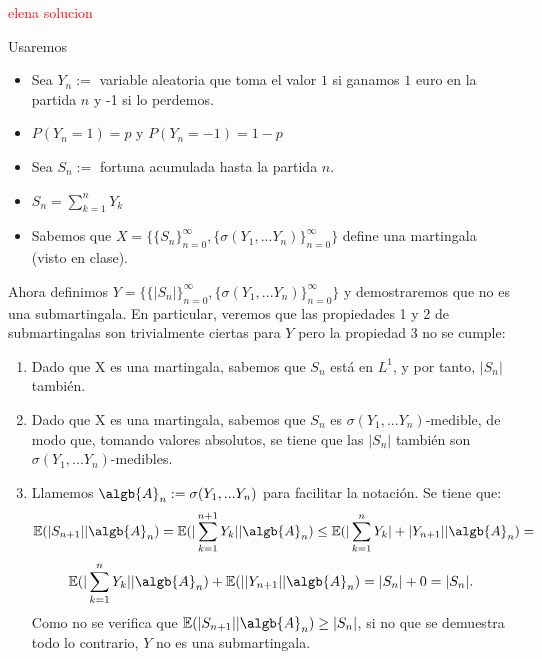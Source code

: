 \begin{problem}[3]
\textcolor{red}{elena solucion}
\begin{expla}
Usaremos
\begin{itemize}
\item Sea $Y_{n}:=$ variable aleatoria que toma el valor $1$ si ganamos $1$ euro en la partida $n$ y -1 si lo perdemos.
\item $P(Y_{n}=1)=p$ y $P(Y_{n}=-1)=1-p$
\item Sea $S_{n}:=$ fortuna acumulada hasta la partida $n$.
\item $S_{n}=\sum_{k=1}^{n} Y_k$
\item Sabemos que $X=\{\{S_n\}_{n=0}^{\infty},  \{\sigma(Y_1,...Y_n)\}_{n=0}^{\infty}\}$ define una martingala (visto en clase).
\end{itemize}
\end{expla}
Ahora definimos  $Y=\{\{|S_n|\}_{n=0}^{\infty},  \{\sigma(Y_1,...Y_n)\}_{n=0}^{\infty}\}$ y demostraremos que no es una submartingala. En particular, veremos que las propiedades 1 y 2 de submartingalas son trivialmente ciertas para $Y$ pero la propiedad 3 no se cumple:

\begin {enumerate}
\item Dado que X es una martingala, sabemos que $S_{n}$ está en $L^1$, y por tanto,  $|S_{n}|$ también.
\item Dado que X es una martingala, sabemos que  $S_{n}$ es $\sigma(Y_1,...Y_n)$-medible, de modo que, tomando valores absolutos, se tiene que las  $|S_{n}|$ también son $\sigma(Y_1,...Y_n)$-medibles.

\item Llamemos $\algb{A}_{n}:=\sigma(Y_1,...Y_n)$ para facilitar la notación. Se tiene que:
\[
 \mathbb{E}(|S_{n+1}||\algb{A}_{n}) = \mathbb{E}(|\sum_{k=1}^{n+1} Y_k||\algb{A}_{n}) \leq  \mathbb{E}(|\sum_{k=1}^{n} Y_k|+ |Y_{n+1}||\algb{A}_{n})  =
\]
\[
  \mathbb{E}(|\sum_{k=1}^{n} Y_k||\algb{A}_{n})  +  \mathbb{E}(| |Y_{n+1}||\algb{A}_{n}) = |S_{n}| + 0 = |S_{n}|.
\]
Como no se verifica que $ \mathbb{E}(|S_{n+1}||\algb{A}_{n}) \geq |S_n|$, si no que se demuestra todo lo contrario,  $Y$ no es una submartingala.
\end{enumerate}


\end{problem}









